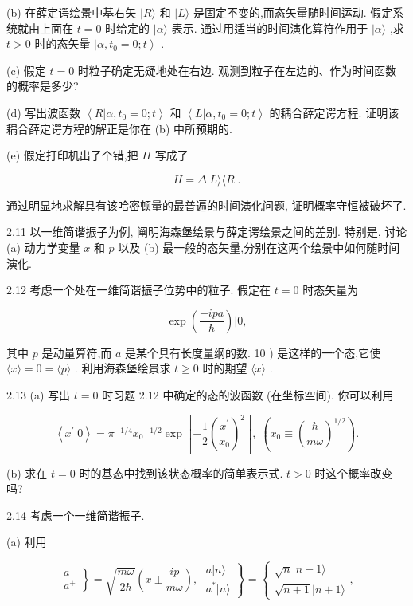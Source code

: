 \documentclass[lang=cn,newtx,10pt,scheme=chinese,thmcnt=section]{elegantbook}
\begin{document}
(b) 在薛定谔绘景中基右矢 $|R\rangle$ 和 $|L\rangle$ 是固定不变的,而态矢量随时间运动. 假定系统就由上面在 $t = 0$ 时给定的 $|\alpha \rangle$ 表示. 通过用适当的时间演化算符作用于 $|\alpha \rangle$ ,求 $t > 0$ 时的态矢量 $\left| {\alpha ,{t}_{0} = 0;t}\right\rangle$ .

(c) 假定 $t = 0$ 时粒子确定无疑地处在右边. 观测到粒子在左边的、作为时间函数的概率是多少?

(d) 写出波函数 $\left\langle {R | \alpha ,{t}_{0} = 0;t}\right\rangle$ 和 $\left\langle {L | \alpha ,{t}_{0} = 0;t}\right\rangle$ 的耦合薛定谔方程. 证明该耦合薛定谔方程的解正是你在 (b) 中所预期的.

(e) 假定打印机出了个错,把 $H$ 写成了

$$
H = \Delta \left| {L\rangle \langle R}\right| .
$$

通过明显地求解具有该哈密顿量的最普遍的时间演化问题, 证明概率守恒被破坏了.

2.11 以一维简谐振子为例, 阐明海森堡绘景与薛定谔绘景之间的差别. 特别是, 讨论 (a) 动力学变量 $x$ 和 $p$ 以及 (b) 最一般的态矢量,分别在这两个绘景中如何随时间演化.

2.12 考虑一个处在一维简谐振子位势中的粒子. 假定在 $t = 0$ 时态矢量为

$$
\exp \left( \frac{-{ipa}}{\hbar }\right) | 0,
$$

其中 $p$ 是动量算符,而 $a$ 是某个具有长度量纲的数. 10 ) 是这样的一个态,它使 $\langle x\rangle = 0 = \langle p\rangle$ . 利用海森堡绘景求 $t \geq 0$ 时的期望 $\langle x\rangle$ .

2.13 (a) 写出 $t = 0$ 时习题 2.12 中确定的态的波函数 (在坐标空间). 你可以利用

$$
\left\langle {{x}^{\prime } | 0}\right\rangle = {\pi }^{-1/4}{x}_{0}{}^{-1/2}\exp \left\lbrack {-\frac{1}{2}{\left( \frac{{x}^{\prime }}{{x}_{0}}\right) }^{2}}\right\rbrack ,\;\left( {{x}_{0} \equiv {\left( \frac{\hbar }{m\omega }\right) }^{1/2}}\right) .
$$

(b) 求在 $t = 0$ 时的基态中找到该状态概率的简单表示式. $t > 0$ 时这个概率改变吗?

2.14 考虑一个一维简谐振子.

(a) 利用

$$
\left. \begin{array}{l} a \\ {a}^{ + } \end{array}\right\} = \sqrt{\frac{m\omega }{2\hbar }}\left( {x \pm \frac{ip}{m\omega }}\right) ,\;\left. \begin{array}{l} a | n\rangle \\ {a}^{ * } | n\rangle \end{array}\right\} = \left\{ {\begin{array}{l} \sqrt{n} | n - 1\rangle \\ \sqrt{n + 1} | n + 1\rangle \end{array},}\right.
$$
\end{document}

